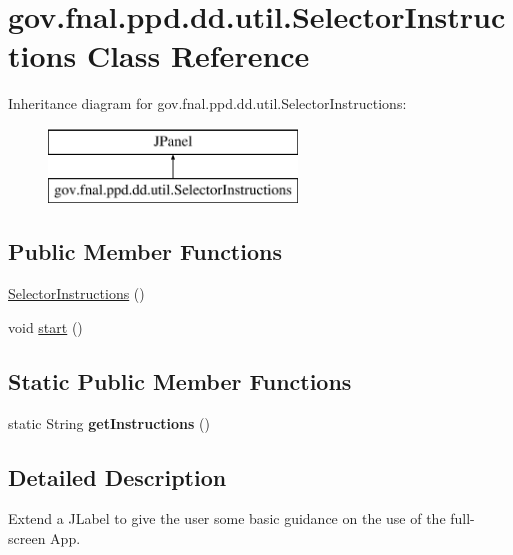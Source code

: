 \hypertarget{classgov_1_1fnal_1_1ppd_1_1dd_1_1util_1_1SelectorInstructions}{\section{gov.\-fnal.\-ppd.\-dd.\-util.\-Selector\-Instructions Class Reference}
\label{classgov_1_1fnal_1_1ppd_1_1dd_1_1util_1_1SelectorInstructions}
}
Inheritance diagram for gov.\-fnal.\-ppd.\-dd.\-util.\-Selector\-Instructions\-:\begin{figure}[H]
\begin{center}
\leavevmode
\includegraphics[height=2.000000cm]{classgov_1_1fnal_1_1ppd_1_1dd_1_1util_1_1SelectorInstructions}
\end{center}
\end{figure}
\subsection*{Public Member Functions}
\begin{DoxyCompactItemize}
\item 
\hyperlink{classgov_1_1fnal_1_1ppd_1_1dd_1_1util_1_1SelectorInstructions_aa7d5e87c6606d7a8d910d94bffd2bf13}{Selector\-Instructions} ()
\item 
void \hyperlink{classgov_1_1fnal_1_1ppd_1_1dd_1_1util_1_1SelectorInstructions_a90e36e8a6819e15ab5bef2a9a5ff835f}{start} ()
\end{DoxyCompactItemize}
\subsection*{Static Public Member Functions}
\begin{DoxyCompactItemize}
\item 
\hypertarget{classgov_1_1fnal_1_1ppd_1_1dd_1_1util_1_1SelectorInstructions_ac180ad936016af951d993e518f5a4ac4}{static String {\bfseries get\-Instructions} ()}\label{classgov_1_1fnal_1_1ppd_1_1dd_1_1util_1_1SelectorInstructions_ac180ad936016af951d993e518f5a4ac4}

\end{DoxyCompactItemize}


\subsection{Detailed Description}
Extend a J\-Label to give the user some basic guidance on the use of the full-\/screen App.

